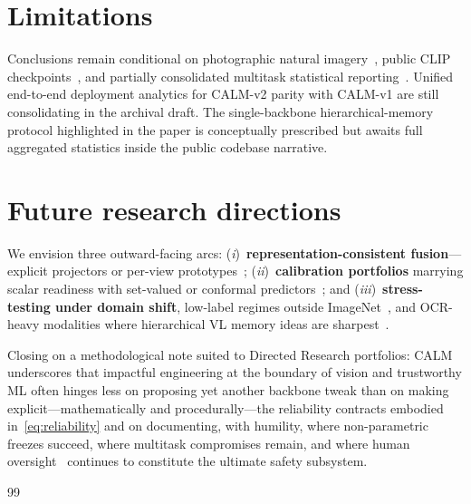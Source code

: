\documentclass[12pt,a4paper]{report}
\begin{document}
\section{Limitations}
Conclusions remain conditional on photographic natural imagery~\cite{r2}, public CLIP checkpoints~\cite{r1}, and partially consolidated multitask statistical reporting~\cite{r19}. Unified end-to-end deployment analytics for CALM-v2 parity with CALM-v1 are still consolidating in the archival draft. The single-backbone hierarchical-memory protocol highlighted in the paper is conceptually prescribed but awaits full aggregated statistics inside the public codebase narrative.

\section{Future research directions}
We envision three outward-facing arcs: (\emph{i})~\textbf{representation-consistent fusion}---explicit projectors or per-view prototypes~\cite{r21}; (\emph{ii})~\textbf{calibration portfolios} marrying scalar readiness with set-valued or conformal predictors~\cite{r10}; and (\emph{iii})~\textbf{stress-testing under domain shift}, low-label regimes outside ImageNet~\cite{r28,r30}, and OCR-heavy modalities where hierarchical VL memory ideas are sharpest~\cite{r31,r32}.

Closing on a methodological note suited to Directed Research portfolios: CALM underscores that impactful engineering at the boundary of vision and trustworthy ML often hinges less on proposing yet another backbone tweak than on making explicit---mathematically and procedurally---the reliability contracts embodied in~\eqref{eq:reliability} and on documenting, with humility, where non-parametric freezes succeed, where multitask compromises remain, and where human oversight~\cite{r24} continues to constitute the ultimate safety subsystem.

\clearpage
\begin{thebibliography}{99}

\end{thebibliography}
\end{document}
